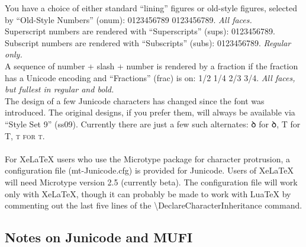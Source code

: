 \documentclass[a4paper]{article}
\begin{document}
\noindent You have a choice of either standard “lining” figures or old-style
figures, selected by “Old-Style Numbers” (onum): 0123456789
{0123456789.} {\itshape All
  faces.}\\

\noindent Superscript numbers are rendered with “Superscripts” (sups):
{ 0123456789}.  Subscript numbers
are rendered with “Subscripts” (subs):
{ 0123456789}.  {\itshape Regular
  only.}\\

\noindent A sequence of number + slash + number is rendered by a fraction if the
fraction has a Unicode encoding and “Fractions” (frac) is on:
{ 1/2 1/4 2/3 3/4}. {\itshape All
  faces, but fullest in regular and bold.}\\

\noindent The design of a few Junicode characters has changed since the font was
introduced. The original designs, if you prefer them, will always be
available via “Style Set 9” (ss09). Currently there are just a few
such alternates: { ꝺ} for ꝺ,
{ T} for T,
{\scshape{ t} for t}.\\

\\

\noindent For XeLaTeX users who use the Microtype package for
character protrusion, a
configuration file (mt-Junicode.cfg) is provided for Junicode. Users
of XeLaTeX will need Microtype version 2.5 (currently beta). The
configuration file will work only with XeLaTeX, though it can probably be made
to work with LuaTeX by commenting out the last five lines of the
{\textbackslash}DeclareCharacterInheritance command.

\pagebreak
\subsection*{Notes on Junicode and MUFI}
\end{document}
